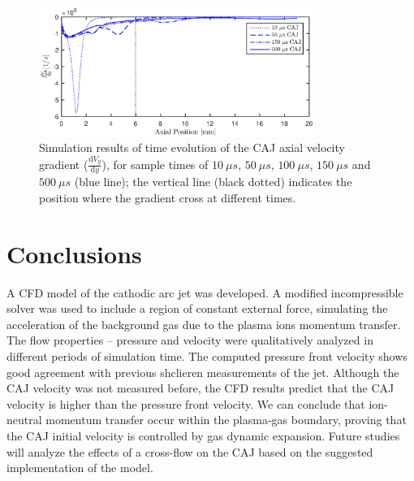 \documentclass[a4paper]{iacas}%
\begin{document}
\begin{figure}
	\centering
	\includegraphics[width=0.8\textwidth]{CAJAcceleration.eps}
	\caption{Simulation results of time evolution of the CAJ axial velocity gradient ($\frac{\mathrm{d}V_y}{\mathrm{d}y}$), for sample times of $10~\mu s$, $50~\mu s$, $100~\mu s$, $150~\mu s$ and $500~\mu s$ (blue line); the vertical line (black dotted) indicates the position where the gradient cross at different times. }
	\label{fig:model_caj_acceleration}
\end{figure}
\section{Conclusions}
A CFD model of the cathodic arc jet was developed.
A modified incompressible solver was used to include a region of constant external force, simulating the acceleration of the background gas due to the plasma ions momentum transfer.
The flow properties -- pressure and velocity were qualitatively analyzed in different periods of simulation time. The computed pressure front velocity shows good agreement with previous shclieren measurements of the jet. Although the CAJ velocity was not measured before, the CFD results predict that the CAJ velocity is higher than the pressure front velocity.
We can conclude that ion-neutral momentum transfer occur within the plasma-gas boundary, proving that the CAJ initial velocity is controlled by gas dynamic expansion. 
Future studies will analyze the effects of a cross-flow on the CAJ based on the suggested implementation of the model.

\clearpage


\end{document}
